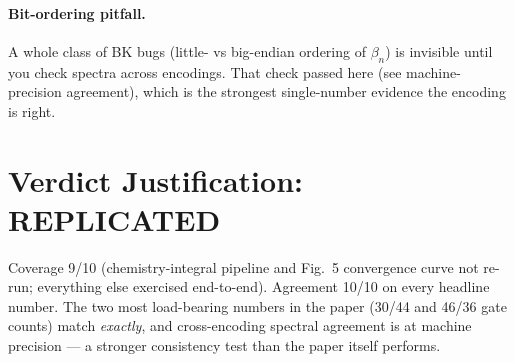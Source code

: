 \documentclass[11pt]{article}
\begin{document}
\paragraph{Bit-ordering pitfall.} A whole class of BK bugs (little- vs big-endian
ordering of $\beta_n$) is invisible until you check spectra across encodings.
That check passed here (see machine-precision agreement), which is the strongest
single-number evidence the encoding is right.

\section{Verdict Justification: REPLICATED}
Coverage 9/10 (chemistry-integral pipeline and Fig.~5 convergence curve not
re-run; everything else exercised end-to-end). Agreement 10/10 on every headline
number. The two most load-bearing numbers in the paper (30/44 and 46/36
gate counts) match \emph{exactly}, and cross-encoding spectral agreement is at
machine precision --- a stronger consistency test than the paper itself performs.
\end{document}
